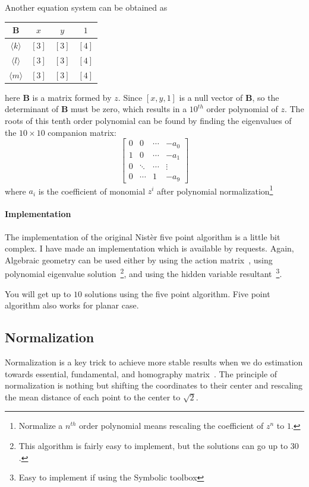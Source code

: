 \documentclass[a4paper]{report}
\begin{document}
Another equation system can be obtained as
\begin{center}
	\begin{tabular}{ |c|ccc|} 
		\hline
		$\mathbf{B}$ & $x$ & $y$ & $1$ \\ \hline
		 $\langle k \rangle$  & $[3]$ & $[3]$ & $[4]$ \\
		 $\langle l \rangle$  & $[3]$ & $[3]$ & $[4]$ \\
 		 $\langle m \rangle$  & $[3]$ & $[3]$ & $[4]$ \\
		\hline
	\end{tabular}
\end{center}
here $\mathbf{B}$ is a matrix formed by $z$.
Since $[x,y,1]$ is a null vector of $\mathbf{B}$, so the determinant of $\mathbf{B}$ must be zero, which results in a $10^{th}$ order polynomial of $z$. The roots of this tenth order polynomial can be found by finding the eigenvalues of the $10 \times 10$ companion matrix:
$$
\left[
\begin{matrix}
0 & 0 & \cdots & -a_0 \\
1 &  0 & \cdots & -a_1 \\
0 & \ddots & \cdots & \vdots \\
0 & \cdots & 1 & -a_9
\end{matrix}
\right]
$$
where $a_i$ is the coefficient of monomial $z^{i}$ after polynomial normalization\footnote{Normalize a $n^{th}$ order polynomial means rescaling the coefficient of $z^{n}$ to $1$.}
\paragraph{Implementation}
The implementation of the original Nist\`er five point algorithm is a little bit complex. I have made an implementation which is available by requests.  Again, Algebraic geometry can be used either by using the action matrix~\cite{stewenius2006recent}, using polynomial eigenvalue solution~\cite{kukelova2008polynomial}\footnote{This algorithm is fairly easy to implement, but the solutions can go up to $30$.}, and using the hidden variable resultant~\cite{li2006five}\footnote{Easy to implement if using the Symbolic toolbox}.

You will get up to $10$ solutions using the five point algorithm. Five point algorithm also works for planar case. 

\subsection{Normalization}
Normalization is a key trick to achieve more stable results when we do estimation towards essential, fundamental, and homography matrix~\cite{hartley1995defence}. The principle of normalization is nothing but shifting the coordinates to their center and rescaling the mean distance of each point to the center to $\sqrt{2}$.
\end{document}
